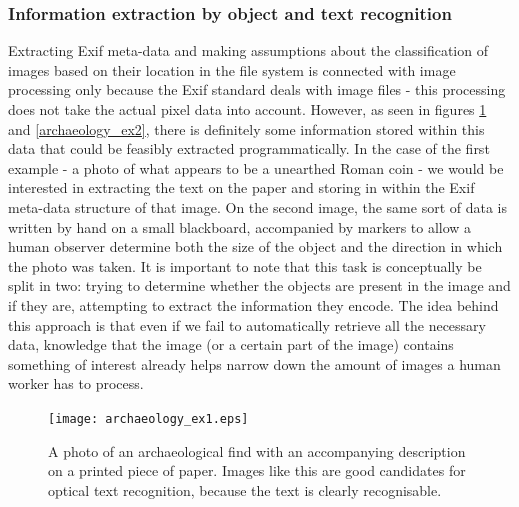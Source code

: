 \documentclass [12pt,a4paper]{report}
\begin{document}
\subsubsection{Information extraction by object and text recognition}

Extracting Exif meta-data and making assumptions about the classification of images based on their location in the file system is connected with image processing only because the Exif standard deals with image files - this processing does not take the actual pixel data into account. However, as seen in figures \ref{archaeology_ex1} and \ref{archaeology_ex2}, there is definitely some information stored within this data that could be feasibly extracted programmatically. In the case of the first example - a photo of what appears to be a unearthed Roman coin - we would be interested in extracting the text on the paper and storing in within the Exif meta-data structure of that image. On the second image, the same sort of data is written by hand on a small blackboard, accompanied by markers to allow a human observer determine both the size of the object and the direction in which the photo was taken. It is important to note that this task is conceptually be split in two: trying to determine whether the objects are present in the image and if they are, attempting to extract the information they encode. The idea behind this approach is that even if we fail to automatically retrieve all the necessary data, knowledge that the image (or a certain part of the image) contains something of interest already helps narrow down the amount of images a human worker has to process.

\begin{center}
\begin{figure}[h]
\centering
\texttt{[image: archaeology\_ex1.eps]} %
\caption{A photo of an archaeological find with an accompanying description on a printed piece of paper. Images like this are good candidates for optical text recognition, because the text is clearly recognisable.}
\label{archaeology_ex1}
\end{figure}
\end{center}
\end{document}
